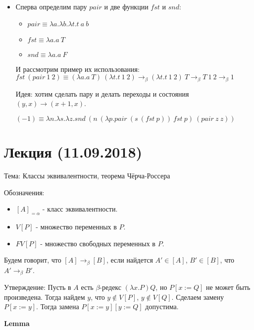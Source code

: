 \documentclass[12pt]{extreport}
\begin{document}
\begin{itemize}
\begin{itemize}
        \item Сперва определим пару $pair$ и две функции $fst$ и $snd$:
        \begin{itemize}
            \item $pair \equiv \lambda a.\lambda b.\lambda t. t\ a\ b$
            \item $fst \equiv \lambda a. a\ T$
            \item $snd \equiv \lambda a. a\ F$
        \end{itemize}
        И рассмотрим пример их использования: $fst\ (pair\ 1\ 2) \equiv (\lambda a. a\ T)\ (\lambda t. t\ 1\ 2) \rightarrow_\beta (\lambda t. t\ 1\ 2)\ T \rightarrow_\beta T\ 1\ 2 \rightarrow_\beta 1$
        
        Идея: хотим сделать пару и делать переходы и состояния $(y, x) \rightarrow (x + 1, x)$. 
        
        $(-1) \equiv \lambda n. \lambda s. \lambda z. snd\ (n\ (\lambda p. pair\ (s\ (fst\ p))\ fst\ p)\ (pair\ z\ z)) $
    \end{itemize}
\end{itemize}



\section{Лекция (11.09.2018)}

Тема: Классы эквивалентности, теорема Чёрча-Россера

Обозначения: 
\begin{itemize}[leftmargin=2cm]
    \item $[A]_{=\alpha}$ - класс эквивалентности.
    \item $V[P]$ - множество переменных в $P$.
    \item $FV[P]$ - множество свободных переменных в $P$.
\end{itemize}

Будем говорит, что $[A]\rightarrow_\beta[B]$, если найдется $A' \in [A]$, $B' \in [B]$, что $A' \rightarrow_\beta B'$.      


Утверждение: Пусть в $A$ есть $\beta$-редекс $(\lambda x.P)Q$, но $P[x := Q]$ не может быть произведена. Тогда найдем $y$, что $y \not\in V[P]$, $y \not\in V[Q]$. Сделаем замену $P[x := y]$. Тогда замена $P[x := y][y := Q]$ допустима. 

\vspace{5mm} %

\noindent\textbf{Lemma} 
\end{document}
